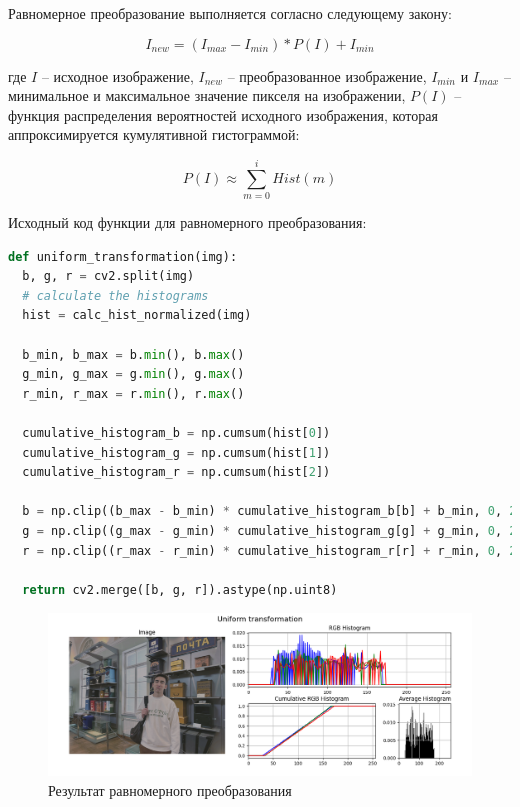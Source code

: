 Равномерное преобразование выполняется согласно следующему закону:

\begin{equation}
  I_{new} = \left( I_{max} - I_{min} \right) * P(I) + I_{min}
\end{equation}

где $I$ -- исходное изображение, $I_{new}$ -- преобразованное изображение, $I_{min}$ и $I_{max}$ -- минимальное и максимальное значение пикселя на изображении, $P(I)$ -- функция распределения вероятностей исходного изображения, которая аппроксимируется кумулятивной гистограммой: 

\begin{equation}
  P(I) \approx \sum\limits_{m=0}^{i} Hist(m)
\end{equation}

Исходный код функции для равномерного преобразования:

\begin{lstlisting}[language=Python]
def uniform_transformation(img):
  b, g, r = cv2.split(img)
  # calculate the histograms
  hist = calc_hist_normalized(img)

  b_min, b_max = b.min(), b.max()
  g_min, g_max = g.min(), g.max()
  r_min, r_max = r.min(), r.max()

  cumulative_histogram_b = np.cumsum(hist[0]) 
  cumulative_histogram_g = np.cumsum(hist[1])
  cumulative_histogram_r = np.cumsum(hist[2])

  b = np.clip((b_max - b_min) * cumulative_histogram_b[b] + b_min, 0, 255)
  g = np.clip((g_max - g_min) * cumulative_histogram_g[g] + g_min, 0, 255)
  r = np.clip((r_max - r_min) * cumulative_histogram_r[r] + r_min, 0, 255)

  return cv2.merge([b, g, r]).astype(np.uint8)
\end{lstlisting}

\begin{figure}[H]
    \centering
    \includegraphics[width=\textwidth]{../results/Uniform transformation.png}
    \caption{Результат равномерного преобразования}
    \label{fig:uniform}
\end{figure}

